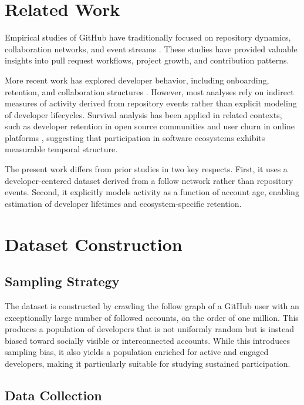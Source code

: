 \documentclass[12pt,a4paper]{article}
\begin{document}
\section{Related Work}

Empirical studies of GitHub have traditionally focused on repository dynamics, collaboration networks, and event streams \citep{kalliamvakou2014promises, gousios2014ghtorrent}. These studies have provided valuable insights into pull request workflows, project growth, and contribution patterns.

More recent work has explored developer behavior, including onboarding, retention, and collaboration structures \citep{zhou2016information, joblin2017classifying}. However, most analyses rely on indirect measures of activity derived from repository events rather than explicit modeling of developer lifecycles. Survival analysis has been applied in related contexts, such as developer retention in open source communities and user churn in online platforms \citep{vasilescu2015gender}, suggesting that participation in software ecosystems exhibits measurable temporal structure.

The present work differs from prior studies in two key respects. First, it uses a developer-centered dataset derived from a follow network rather than repository events. Second, it explicitly models activity as a function of account age, enabling estimation of developer lifetimes and ecosystem-specific retention.

\section{Dataset Construction}

\subsection{Sampling Strategy}

The dataset is constructed by crawling the follow graph of a GitHub user with an exceptionally large number of followed accounts, on the order of one million. This produces a population of developers that is not uniformly random but is instead biased toward socially visible or interconnected accounts. While this introduces sampling bias, it also yields a population enriched for active and engaged developers, making it particularly suitable for studying sustained participation.

\subsection{Data Collection}
\end{document}
